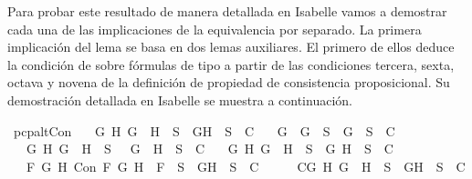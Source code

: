 \begin{isabellebody}
\begin{isamarkuptext}
  Para probar este resultado de manera detallada en Isabelle vamos a demostrar cada una de las 
  implicaciones de la equivalencia por separado. La primera implicación del lema se basa en dos 
  lemas auxiliares. El primero de ellos deduce la condición de  sobre fórmulas de tipo \isa{{\isasymalpha}} a 
  partir de las condiciones tercera, sexta, octava y novena de la definición de propiedad de 
  consistencia proposicional. Su demostración detallada en Isabelle se muestra a continuación.%
\end{isamarkuptext}\isamarkuptrue%
\isamarkupfalse%
\ pcp{\isacharunderscore}alt{}Con{\isacharcolon}\isanewline
\ \ \ {\isachardoublequoteopen}{\isacharparenleft}{\isasymforall}G\ H{\isachardot}\ G\ \isactrlbold {\isasymand}\ H\ {\isasymin}\ S\ {\isasymlongrightarrow}\ {\isacharbraceleft}G{\isacharcomma}H{\isacharbraceright}\ {\isasymunion}\ S\ {\isasymin}\ C{\isacharparenright}\isanewline
\ \ {\isasymand}\ {\isacharparenleft}{\isasymforall}G{\isachardot}\ \isactrlbold {\isasymnot}\ {\isacharparenleft}\isactrlbold {\isasymnot}G{\isacharparenright}\ {\isasymin}\ S\ {\isasymlongrightarrow}\ {\isacharbraceleft}G{\isacharbraceright}\ {\isasymunion}\ S\ {\isasymin}\ C{\isacharparenright}\isanewline
\ \ {\isasymand}\ {\isacharparenleft}{\isasymforall}G\ H{\isachardot}\ \isactrlbold {\isasymnot}{\isacharparenleft}G\ \isactrlbold {\isasymor}\ H{\isacharparenright}\ {\isasymin}\ S\ {\isasymlongrightarrow}\ {\isacharbraceleft}\isactrlbold {\isasymnot}\ G{\isacharcomma}\ \isactrlbold {\isasymnot}\ H{\isacharbraceright}\ {\isasymunion}\ S\ {\isasymin}\ C{\isacharparenright}\isanewline
\ \ {\isasymand}\ {\isacharparenleft}{\isasymforall}G\ H{\isachardot}\ \isactrlbold {\isasymnot}{\isacharparenleft}G\ \isactrlbold {\isasymrightarrow}\ H{\isacharparenright}\ {\isasymin}\ S\ {\isasymlongrightarrow}\ {\isacharbraceleft}G{\isacharcomma}\isactrlbold {\isasymnot}\ H{\isacharbraceright}\ {\isasymunion}\ S\ {\isasymin}\ C{\isacharparenright}{\isachardoublequoteclose}\isanewline
\ \ \ {\isachardoublequoteopen}{\isasymforall}F\ G\ H{\isachardot}\ Con\ F\ G\ H\ {\isasymlongrightarrow}\ F\ {\isasymin}\ S\ {\isasymlongrightarrow}\ {\isacharbraceleft}G{\isacharcomma}H{\isacharbraceright}\ {\isasymunion}\ S\ {\isasymin}\ C{\isachardoublequoteclose}\isanewline
%
\isadelimproof
%
\endisadelimproof
%
\isatagproof
{}\isamarkupfalse%
\ {\isacharminus}\isanewline
\ \ \isamarkupfalse%
\ C{}{\isacharcolon}{\isachardoublequoteopen}{\isasymforall}G\ H{\isachardot}\ G\ \isactrlbold {\isasymand}\ H\ {\isasymin}\ S\ {\isasymlongrightarrow}\ {\isacharbraceleft}G{\isacharcomma}H{\isacharbraceright}\ {\isasymunion}\ S\ {\isasymin}\ C{\isachardoublequoteclose}\isanewline

\end{isabellebody}
